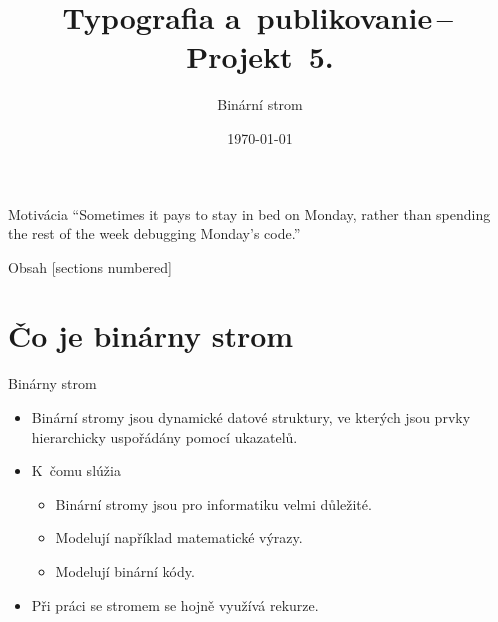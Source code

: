 \documentclass[10pt, hyperref={unicode}]{beamer}
\title{Typografia a~publikovanie\,--\,Projekt~5.}
\author{Binární strom}
\date{\today}
\begin{document}
\maketitle

\begin{frame}{Motivácia}
	    ``Sometimes it pays to stay in bed on Monday, rather than spending the rest of the week debugging Monday’s code.''
        \\[5pt]
\end{frame}


\begin{frame}{Obsah}
	[sections numbered]
	\tableofcontents[hideallsubsections]
\end{frame}

\section{Čo je binárny strom}
\begin{frame}{Binárny strom}
	\begin{itemize}
		\item Binární stromy jsou dynamické datové struktury, ve kterých jsou prvky hierarchicky uspořádány pomocí ukazatelů.
        \bigskip
		\item K~čomu slúžia
			\begin{itemize}
				\item Binární stromy jsou pro informatiku velmi důležité.
				\item Modelují například matematické výrazy.
				\item Modelují binární kódy.
			\end{itemize}
			\bigskip
		\item Při práci se stromem se hojně využívá rekurze.
	\end{itemize}
\end{frame}
\end{document}
